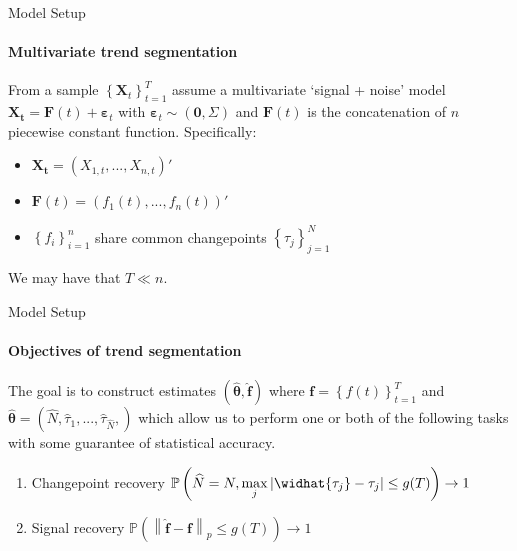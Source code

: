 \documentclass{beamer}
\begin{document}

\begin{frame}{Model Setup}
\framesubtitle{Multivariate trend segmentation}

From a sample $\left \{ \boldsymbol{X}_t \right \}_{t=1}^T$ assume a multivariate `signal + noise' model $\boldsymbol{X_t} = \boldsymbol{F}(t) + \boldsymbol{\varepsilon}_t$ with $\boldsymbol{\varepsilon}_t \sim \left ( \boldsymbol{0}, \Sigma \right )$ and $\boldsymbol{F}(t)$ is the concatenation of $n$ piecewise constant function. Specifically: 

\bigskip

\begin{itemize}
    \item $\boldsymbol{X_t} = \left ( X_{1,t},...,X_{n,t}\right )'$
    \item $\boldsymbol{F}(t) = \left ( f_1(t), ..., f_n(t)\right )'$
    \item $\left \{ f_i\right \}_{i=1}^n$ share common changepoints $\left \{ \tau_j \right \} _{j=1}^N$
\end{itemize}

\bigskip

We may have that $T \ll n$. 

\end{frame}


\begin{frame}{Model Setup}
\framesubtitle{Objectives of trend segmentation}

\doublespacing
The goal is to construct estimates $\left ( \boldsymbol{\widehat{\theta}}, \boldsymbol{\widehat{f}} \right )$ where $\boldsymbol{f} = \left \{ f(t) \right \}_{t=1}^T$ and  $\boldsymbol{\widehat{\theta}} = \left ( \widehat{N}, \widehat{\tau}_1, ..., \widehat{\tau}_{\widehat{N}}, \right )$ which allow us to perform one or both of the following tasks with some guarantee of statistical accuracy.

\bigskip

\begin{enumerate}
    \item Changepoint recovery $\mathbb{P} \left ( \widehat{N} = N, \underset{j}{\max} \left | \widhat{\tau_j} - \tau_j \right | \leq g(T) \right ) \rightarrow 1 $
    \item Signal recovery $\mathbb{P} \left ( \left \| \boldsymbol{\widehat{f} - f} \right \|_p \leq g(T) \right ) \rightarrow 1 $
\end{enumerate}

\end{frame}
\end{document}
